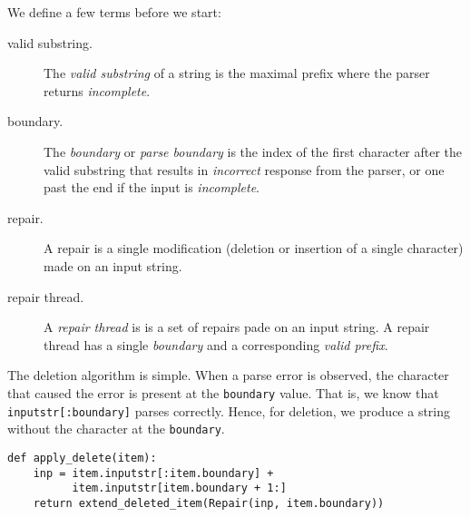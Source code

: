 \documentclass[sigconf,review,anonymous]{acmart}
\def\<#1>{\texttt{#1}}
\newcommand{\brepair}{\textit{BRepair}\xspace}
\begin{document}
We define a few terms before we start:
\begin{description}
\item[valid substring.] The \emph{valid substring} of a string is the maximal prefix where the parser returns
\emph{incomplete}.
\item[boundary.] The \emph{boundary} or \emph{parse boundary} is the index of
the first character after the valid substring that results in
\emph{incorrect} response from the parser, or one past the end if the input is
\emph{incomplete}.
\item[repair.] A repair is a single modification (deletion or insertion of a
single character) made on an input string.
\item[repair thread.] A \emph{repair thread} is is a set of repairs pade on an
input string. A repair thread has a single \emph{boundary} and a corresponding
\emph{valid prefix}.
\end{description}

The deletion algorithm is simple. When a parse error is observed,
the character that caused the error is present at the \<boundary> value.
That is, we know that \<inputstr[:boundary]> parses correctly. Hence, for
deletion, we produce a string without the character at the \<boundary>.
\begin{lstlisting}[caption=\brepair repairs,label={lst:repairsdelete}]
def apply_delete(item):
    inp = item.inputstr[:item.boundary] +
          item.inputstr[item.boundary + 1:]
    return extend_deleted_item(Repair(inp, item.boundary))
\end{lstlisting}
\end{document}
